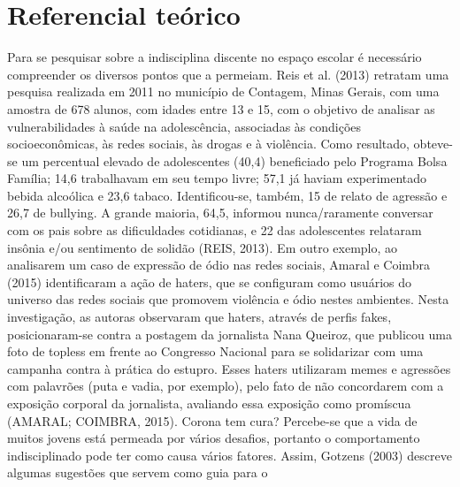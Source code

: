\section{Referencial teórico}
Para se pesquisar sobre a indisciplina discente no
espaço escolar é necessário compreender os diversos
pontos que a permeiam.
Reis et al. (2013) retratam uma pesquisa realizada
em 2011 no município de Contagem, Minas Gerais,
com uma amostra de 678 alunos, com idades entre
13 e 15, com o objetivo de analisar as vulnerabilidades
à saúde na adolescência, associadas às condições
socioeconômicas, às redes sociais, às drogas
e à violência.
Como resultado, obteve-se um percentual elevado
de adolescentes (40,4) beneficiado pelo Programa
Bolsa Família; 14,6 trabalhavam em seu tempo livre;
57,1 já haviam experimentado bebida alcoólica e
23,6 tabaco. Identificou-se, também, 15 de relato
de agressão e 26,7 de bullying. A grande maioria,
64,5, informou nunca/raramente conversar com
os pais sobre as dificuldades cotidianas, e 22 das
adolescentes relataram insônia e/ou sentimento de
solidão (REIS, 2013).
Em outro exemplo, ao analisarem um caso
de expressão de ódio nas redes sociais, Amaral
e Coimbra (2015) identificaram a ação de haters,
que se configuram como usuários do universo das
redes sociais que promovem violência e ódio nestes
ambientes. Nesta investigação, as autoras observaram
que haters, através de perfis fakes, posicionaram-se
contra a postagem da jornalista Nana Queiroz, que
publicou uma foto de topless em frente ao Congresso
Nacional para se solidarizar com uma campanha contra
à prática do estupro. Esses haters utilizaram memes e
agressões com palavrões (puta e vadia, por exemplo),
pelo fato de não concordarem com a exposição
corporal da jornalista, avaliando essa exposição como promíscua (AMARAL; COIMBRA, 2015).
{Corona tem cura?}
Percebe-se que a vida de muitos jovens
está permeada por vários desafios, portanto o
comportamento indisciplinado pode ter como causa
vários fatores. Assim, Gotzens (2003) descreve
algumas sugestões que servem como guia para o